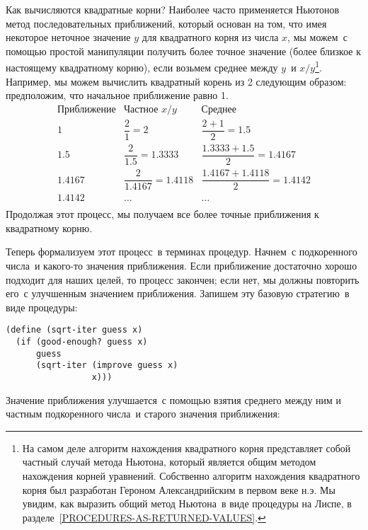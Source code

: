 Как вычисляются квадратные корни?  Наиболее часто
применяется  Ньютонов метод последовательных приближений, который
основан на том, что имея некоторое неточное значение $y$
для квадратного корня из числа $x$, мы можем~с помощью
простой манипуляции получить более точное значение (более близкое к
настоящему квадратному корню), если возьмем среднее между
$y$~и $x/y$\footnote{На самом деле алгоритм нахождения квадратного корня
представляет собой частный случай метода Ньютона, который является
общим методом нахождения корней уравнений.  Собственно алгоритм
нахождения квадратного корня был разработан Героном Александрийским в
первом веке н.э.  Мы увидим, как выразить общий метод Ньютона~в виде
процедуры на Лиспе, в разделе~\ref{PROCEDURES-AS-RETURNED-VALUES}.}.
Например, мы можем вычислить квадратный корень из 2 следующим образом: 
предположим, что начальное приближение равно 1.
$$ %
\begin{array}{lll}
  \mbox{Приближение}    & \mbox{Частное } x/y   & \mbox{Среднее} \\[10pt]
  1             & \dfrac{2}{1} = 2               & \dfrac{2+1}{2} = 1.5 \\[10pt]
  1.5           & \dfrac{2}{1.5} = 1.3333        & \dfrac{1.3333+1.5}{2} = 1.4167 \\[10pt]
  1.4167        & \dfrac{2}{1.4167} = 1.4118     & \dfrac{1.4167+1.4118}{2} = 1.4142 \\[10pt]
  1.4142        & \ldots                        & \ldots \\
\end{array}
$$
Продолжая этот процесс, мы получаем все более точные приближения к
квадратному корню.

Теперь формализуем этот процесс~в терминах
процедур. Начнем~с 
подкоренного числа~и какого-то значения приближения.  Если
приближение достаточно хорошо подходит для наших целей, то процесс закончен;
если нет, мы должны повторить его~с улучшенным значением приближения.
Запишем эту базовую стратегию~в виде процедуры:

\begin{Verbatim}[fontsize=\small]
(define (sqrt-iter guess x)
  (if (good-enough? guess x)
      guess
      (sqrt-iter (improve guess x)
                 x)))
\end{Verbatim}
Значение приближения улучшается~с помощью взятия среднего между ним и
частным подкоренного числа~и старого значения приближения:

